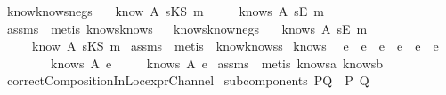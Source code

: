 \begin{isabellebody}
\endisadelimproof
\isanewline
{}\isamarkupfalse \ know{}knows{\isacharunderscore}neg{\isacharunderscore}s{\isacharcolon}\ \isanewline
{}\ {\isachardoublequoteopen}{\isasymnot}\ know\ A\ {\isacharparenleft}sKS\ m{\isacharparenright}{\isachardoublequoteclose}\isanewline
{}\ \ \ \ {\isachardoublequoteopen}{\isasymnot}\ knows\ A\ {\isacharbrackleft}sE\ m{\isacharbrackright}{\isachardoublequoteclose}\ \isanewline
\isadelimproof
\endisadelimproof
\isatagproof
{}\isamarkupfalse \ assms\ \isamarkupfalse \ {\isacharparenleft}metis\ knows{}know{\isacharunderscore}s{\isacharparenright}\endisatagproof
{\isafoldproof}\isadelimproof
\ \isanewline
\endisadelimproof
\isanewline
{}\isamarkupfalse \ knows{}know{\isacharunderscore}neg{\isacharunderscore}s{\isacharcolon}\ \isanewline
{}\ {\isachardoublequoteopen}{\isasymnot}\ knows\ A\ {\isacharbrackleft}sE\ m{\isacharbrackright}{\isachardoublequoteclose}\ \isanewline
{}\ \ \ \ {\isachardoublequoteopen}{\isasymnot}\ know\ A\ {\isacharparenleft}sKS\ m{\isacharparenright}{\isachardoublequoteclose}\isanewline
\isadelimproof
\endisadelimproof
\isatagproof
{}\isamarkupfalse \ assms\ \isamarkupfalse \ {\isacharparenleft}metis\ \ know{}knows{\isacharunderscore}s{\isacharparenright}\endisatagproof
{\isafoldproof}\isadelimproof
\isanewline
\endisadelimproof
\isanewline
{}\isamarkupfalse \ knows{}{\isacharcolon}\ \isanewline
{}\ {\isachardoublequoteopen}e{}\ {\isacharequal}\ e{}\ {\isacharat}\ e\ {\isasymor}\ e{}\ {\isacharequal}\ e\ {\isacharat}\ e{}{\isachardoublequoteclose}\ \isanewline
\ \ \ \ \ \ \ \ {\isachardoublequoteopen}knows\ A\ e{}{\isachardoublequoteclose}\ \isanewline
{}\ \ \ \ {\isachardoublequoteopen}knows\ A\ e{\isachardoublequoteclose}\isanewline
\isadelimproof
\endisadelimproof
\isatagproof
{}\isamarkupfalse \ assms\ \isamarkupfalse \ {\isacharparenleft}metis\ knows{}a\ knows{}b{\isacharparenright}\endisatagproof
{\isafoldproof}\isadelimproof
\isanewline
\endisadelimproof
\ \isanewline
{}\isamarkupfalse \ correctCompositionInLoc{\isacharunderscore}exprChannel{\isacharcolon}\isanewline
{}\ {\isachardoublequoteopen}subcomponents\ PQ\ {\isacharequal}\ {\isacharbraceleft}P{\isacharcomma}\ Q{\isacharbraceright}{\isachardoublequoteclose}\isanewline

\end{isabellebody}
